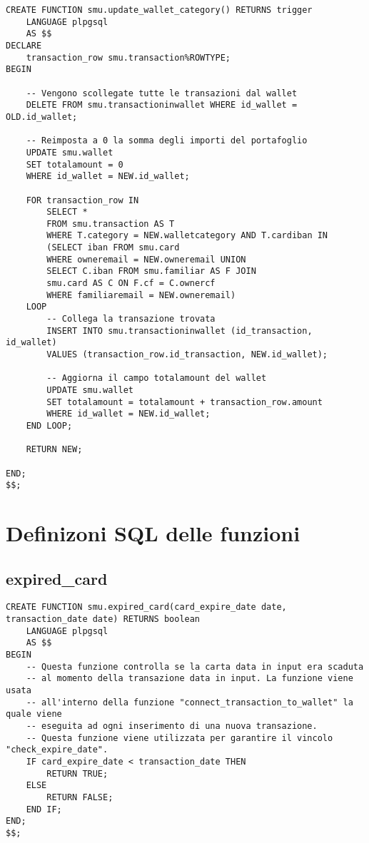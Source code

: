 \begin{lstlisting}
CREATE FUNCTION smu.update_wallet_category() RETURNS trigger
    LANGUAGE plpgsql
    AS $$
DECLARE
    transaction_row smu.transaction%ROWTYPE;
BEGIN

    -- Vengono scollegate tutte le transazioni dal wallet
    DELETE FROM smu.transactioninwallet WHERE id_wallet = OLD.id_wallet;

    -- Reimposta a 0 la somma degli importi del portafoglio
    UPDATE smu.wallet
    SET totalamount = 0
    WHERE id_wallet = NEW.id_wallet;

    FOR transaction_row IN
        SELECT *
        FROM smu.transaction AS T
        WHERE T.category = NEW.walletcategory AND T.cardiban IN
        (SELECT iban FROM smu.card
        WHERE owneremail = NEW.owneremail UNION
        SELECT C.iban FROM smu.familiar AS F JOIN
        smu.card AS C ON F.cf = C.ownercf
        WHERE familiaremail = NEW.owneremail)
    LOOP
        -- Collega la transazione trovata
        INSERT INTO smu.transactioninwallet (id_transaction, id_wallet)
        VALUES (transaction_row.id_transaction, NEW.id_wallet);

        -- Aggiorna il campo totalamount del wallet
        UPDATE smu.wallet
        SET totalamount = totalamount + transaction_row.amount
        WHERE id_wallet = NEW.id_wallet;
    END LOOP;

    RETURN NEW;
    
END;
$$;
\end{lstlisting}

\section{Definizoni SQL delle funzioni}

\subsection{expired\_card}

\begin{lstlisting}
CREATE FUNCTION smu.expired_card(card_expire_date date, transaction_date date) RETURNS boolean
    LANGUAGE plpgsql
    AS $$
BEGIN
    -- Questa funzione controlla se la carta data in input era scaduta
    -- al momento della transazione data in input. La funzione viene usata
    -- all'interno della funzione "connect_transaction_to_wallet" la quale viene
    -- eseguita ad ogni inserimento di una nuova transazione.
    -- Questa funzione viene utilizzata per garantire il vincolo "check_expire_date".
    IF card_expire_date < transaction_date THEN
        RETURN TRUE;
    ELSE
        RETURN FALSE;
    END IF;
END;
$$;
\end{lstlisting}